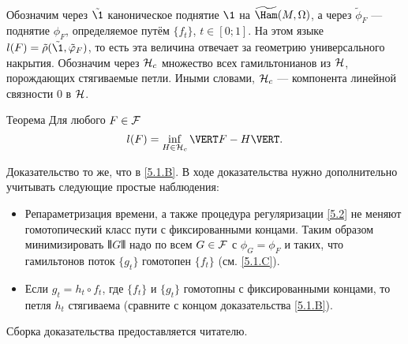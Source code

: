 Обозначим через $\tilde\1$ каноническое поднятие $\1$ на
$\widetilde\Ham(M, \Omega)$, а через 
$\tilde\phi_F$ — поднятие $\phi_F$, определяемое путём $\{f_t\}$, $t
\in [0; 1]$. 
На этом языке $l (F) = \tilde\rho (\tilde\1, \tilde\phi_F)$, то есть
эта величина отвечает за геометрию универсального накрытия. 
Обозначим через $\mathcal{H}_c$ множество всех гамильтонианов из $\mathcal{H}$,
порождающих стягиваемые петли. 
Иными словами, $\mathcal{H}_c$ — компонента линейной связности $0$ в $\mathcal{H}$.

\begin{thm}{Теорема}\label{5.3.A}
Для любого $F \in \mathcal{F}$ 
\[l (F) = \inf_{H\in\H_c} \VERT F - H \VERT.\]
\end{thm}

Доказательство то же, что в \ref{5.1.B}.
В ходе доказательства нужно дополнительно учитывать следующие простые наблюдения:
\begin{itemize}
\item Репараметризация времени, а также процедура регуляризации \ref{5.2} не меняют гомотопический класс пути с фиксированными концами.
Таким образом минимизировать $\VERT G \VERT$ надо по всем $G \z\in \F$ с $\phi_G = \phi_F$ и таких, что гамильтонов поток $\{g_t\}$ гомотопен $\{f_t\}$ (см. \ref{5.1.C}).
\item Если $g_t = h_t \circ f_t$, где $\{f_t\}$ и $\{g_t\}$ гомотопны с фиксированными концами, то петля $h_t$ стягиваема (сравните с концом доказательства \ref{5.1.B}).
\end{itemize}
Сборка доказательства предоставляется читателю.
